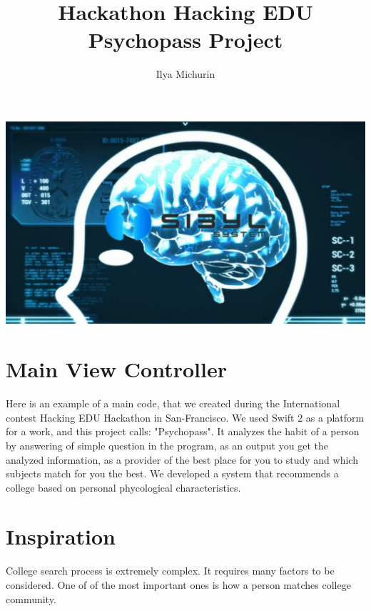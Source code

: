 \documentclass{tufte-handout}
\title{Hackathon Hacking EDU Psychopass Project}
\author[The Academy]{Ilya Michurin}
\begin{document}
\maketitle %

\begin{marginfigure}
  \includegraphics[width=\linewidth]{psychop.jpg}
  \label{fig:marginfig}
\end{marginfigure}


\normalsize



\section{Main View Controller}
Here is an example of a main code, that we created during the International contest Hacking EDU Hackathon in San-Francisco. We used Swift 2 as a platform for a work, and this project calls: "Psychopass". It analyzes the habit of a person by answering of simple question in the program, as an output you get the analyzed information, as a provider of the best place for you to study and which subjects match for you the best.
We developed a system that recommends a college based on personal phycological characteristics.

\section{Inspiration}
College search process is extremely complex. It requires many factors to be considered. One of of the most important ones is how a person matches college community.



\normalsize

\marginnote[70pt]{\large{}}
\end{document}
